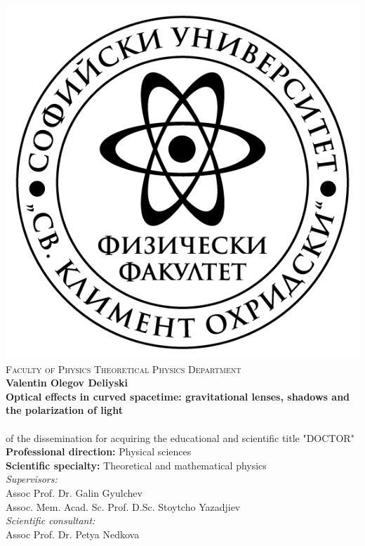 \documentclass[12pt]{article}
\numberwithin{equation}{section}
\numberwithin{figure}{section}
\begin{document}
	
	\thispagestyle{empty}
	\begin{center}
		
		\centering
		\includegraphics[scale = 1]{Title_page/logo-FzF.png}
		\noindent\makebox[\linewidth]{\rule{15cm}{0.8pt}}
		\textsc{Faculty of Physics}
		\noindent\makebox[\linewidth]{\rule{15cm}{0.8pt}}
		\textsc{Theoretical Physics Department}\\
		\bigskip
		\bigskip
		\bigskip
		\bigskip
		{\Large{\textbf{Valentin Olegov Deliyski}}}\\
		\bigskip
		\bigskip
		\bigskip
		{\Large \textbf{Optical effects in curved spacetime: gravitational lenses, shadows and the polarization of light}}\\
		\bigskip
		\bigskip
		\bigskip
		{\textbf{\huge {}}}\\
		\bigskip
		of the dissemination for acquiring the educational and scientific title "DOCTOR"\\
		\bigskip
		\bigskip
		\bigskip
		\textbf{Professional direction:} Physical sciences\\
		\textbf{Scientific specialty:} Theoretical and mathematical physics\\
		\bigskip
		\bigskip
		\bigskip
		\bigskip
		\textit{Supervisors:}\\
		Assoc Prof. Dr. Galin Gyulchev\\
		\bigskip
		Assoc. Mem. Acad. Sc. Prof. D.Sc. Stoytcho Yazadjiev\\
		\bigskip
		\textit{Scientific consultant:}\\
		Assoc Prof. Dr. Petya Nedkova\\
		
		\newpage
	\end{center}
	
\end{document}

